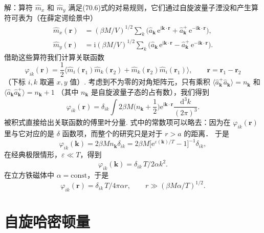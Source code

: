 \begin{xiti}
{\heiti 解：}算符 $\hat{m}_x$ 和 $\hat{m}_y$ 满足(70.6)式的对易规则，它们通过自旋波量子湮没和产生算符可表为（在薛定谔绘景中）
\begin{equation*}
\begin{aligned}
\hat{m}_x(\bm{r})&=(\beta M/V)^{1/2}\sum_k
\bigl(\hat{a}_{\bm{k}}\,\mathrm{e}^{\mathrm{i}\bm{k}\cdot\bm{r}}
+\hat{a}_{\bm{k}}^{+}\,\mathrm{e}^{-\mathrm{i}\bm{k}\cdot\bm{r}}\bigr),\\
\hat{m}_y(\bm{r})&=\mathrm{i}(\beta M/V)^{1/2}\sum_k
\bigl(\hat{a}_{\bm{k}}\,\mathrm{e}^{\mathrm{i}\bm{k}\cdot\bm{r}}
-\hat{a}_{\bm{k}}^{+}\,\mathrm{e}^{-\mathrm{i}\bm{k}\cdot\bm{r}}\bigr).
\end{aligned}
\end{equation*}
借助这些算符我们计算关联函数
\begin{equation*}
\varphi_{ik}(\bm{r})=\frac{1}{2}\bigl\langle
\hat{m}_i(\bm{r}_1)\hat{m}_k(\bm{r}_2)
+\hat{m}_k(\bm{r}_2)\hat{m}_i(\bm{r}_1)\bigr\rangle,
\qquad\bm{r}=\bm{r}_1-\bm{r}_2
\end{equation*}
（下标 $i,k$ 取遍 $x,y$ 值）. 考虑到不为零的对角矩阵元，只有乘积
$\langle\hat{a}_{\bm{k}}^{+}\hat{a}_{\bm{k}}\rangle=n_{\bm{k}}$ 和
$\langle\hat{a}_{\bm{k}}\hat{a}_{\bm{k}}^{+}\rangle=n_{\bm{k}}+1$
（其中 $n_{\bm{k}}$ 是自旋波量子态的占有数），我们得到
\begin{equation*}
\varphi_{ik}(\bm{r})=\delta_{ik}\int2\beta M
\biggl(n_{\bm{k}}+\frac{1}{2}\biggr)\mathrm{e}^{\mathrm{i}\bm{k}\cdot\bm{r}}
\frac{\mathrm{d}^3k}{(2\pi)^3}.
\end{equation*}
被积式直接给出关联函数的傅里叶分量. 式中的常数项可以略去：因为在 $\varphi_{ik}(\bm{r})$ 里与它对应的是 $\delta$ 函数项，而整个的研究只是对于 $r>a$ 的距离． 于是
\begin{equation*}
\varphi_{ik}(\bm{k})=2\beta Mn_{\bm{k}}\delta_{ik}
=2\beta M\bigl[\mathrm{e}^{\varepsilon(\bm{k})/T}-1\bigr]^{-1}\delta_{ik},
\end{equation*}
在经典极限情形，$\varepsilon\ll T$，得到
\begin{equation*}
\varphi_{ik}(\bm{k})=\delta_{ik}\,T/2\alpha k^2.
\end{equation*}
在立方铁磁体中 $\alpha=\mathrm{const}$，于是
\begin{equation*}
\varphi_{ik}(\bm{r})=\delta_{ik}\,T/4\pi\alpha r,\qquad
r\gg(\beta M\alpha/T)^{1/2}.
\end{equation*}

\end{xiti}

\section{自旋哈密顿量}

